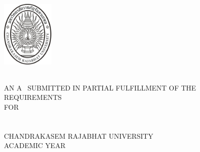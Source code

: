 	{\centering
	\fontsize{16}{18.4}\selectfont
		\includegraphics[width=1in]{CRU_LOGO/CRU_Chandra}\\\vspace{\baselineskip}
		\bfseries\@thesistitle\\
	\vfill
	\fontsize{14}{16.1}\selectfont 
	
	\@author
	\vfill

	\fontsize{13.1}{16.1}\selectfont
	\ifx\@typeofwriting\IndStudy AN	\else A	\fi 
	\expandafter\uppercase\expandafter{\@typeofwriting}\ SUBMITTED IN PARTIAL FULFILLMENT OF THE REQUIREMENTS\\
	FOR \ifdefined\@researchsubject \expandafter\uppercase\expandafter{\@researchsubject} \fi \\
	
	\ifdefined\@degree \expandafter\uppercase\expandafter{\@degree} \fi
	\ifdefined\@major \expandafter\uppercase\expandafter{\@major} \fi \\
	\ifdefined\@faculty \expandafter\uppercase\expandafter{\@faculty} \fi \\
	

	
	CHANDRAKASEM RAJABHAT UNIVERSITY\\
	ACADEMIC YEAR \advance{} \the\year
	\par}


\cleardoublepage
\newpage

	
